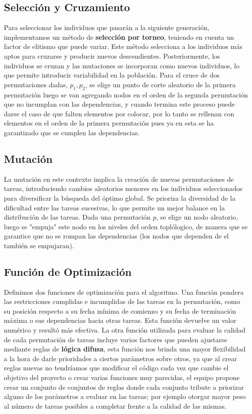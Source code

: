 \documentclass[a4paper, 12pt]{article}
\begin{document}
\subsection{Selección y Cruzamiento}
Para seleccionar los individuos que pasarán a la siguiente generación, implementamos un método de \textbf{selección por torneo}, teniendo en cuenta un factor de elitismo que puede variar. Este método selecciona a los individuos más aptos para cruzarse y producir nuevos descendientes. Posteriormente, los individuos se cruzan y las mutaciones se incorporan como nuevos individuos, lo que permite introducir variabilidad en la población. Para el cruce de dos permutaciones dadas, $p_1, p_2$, se elige un punto de corte aleatorio de la primera permutación luego se van agregando nodos en el orden de la segunda permutaci\'on que no incumplan con las dependencias, y cuando termina este proceso puede darse el caso de que falten elementos por colocar, por lo tanto se rellenan con elementos en el orden de la primera permutación pues ya en esta se ha garantizado que se cumplen las dependencias.

\subsection{Mutación}
La mutación en este contexto implica la creación de nuevas permutaciones de tareas, introduciendo cambios aleatorios menores en los individuos seleccionados para diversificar la búsqueda del óptimo global. Se prioriza la diversidad de la dificultad entre las tareas sucesivas, lo que permite un mejor balance en la distribución de las tareas. Dada una permutación $p$, se elige un nodo aleatorio, luego se "empuja" este nodo en los niveles del orden topl\'ologico, de manera que se garantice que no se rompan las dependencias (los nodos que dependen de el también se empujaran).

\subsection{Función de Optimización}
Definimos dos funciones de optimización para el algoritmo. Una función pondera las restricciones cumplidas e incumplidas de las tareas en la permutación, como su posición respecto a su fecha mínima de comienzo y su fecha de terminación máxima o sus dependencias hacia otras tareas. Esta función devuelve un valor numérico y resultó más efectiva.
La otra función utilizada para evaluar la calidad de cada permutación de tareas incluye varios factores que pueden ajustarse mediante reglas de \textbf{lógica difusa}, esta función nos brinda una mayor flexibilidad a la hora de darle prioridades a ciertos parámetros sobre otros, ya que al crear reglas nuevas no tendríamos que modificar el código cada vez que cambie el objetivo del proyecto o crear varias funciones muy parecidas, el equipo propone crear un conjunto de conjuntos de reglas donde cada conjunto tribute a priorizar alguno de los parámetros a evaluar en las tareas; por ejemplo otorgar mayor peso al número de tareas posibles a completar frente a la calidad de las mismas.
\end{document}
